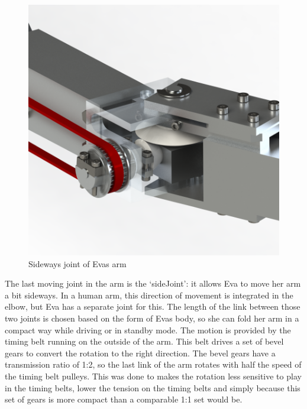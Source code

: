 \documentclass[technical_document.tex]{subfiles}
\begin{document}
\begin{figure}[ht!]
	\centering
	\mbox{\includegraphics[scale=1.0]{Images/arm_sideJoint.png}}
	\caption{Sideways joint of Eva\textquotesingle{}s arm}
	\label{fig:arm_sideJoint}
\end{figure}

The last moving joint in the arm is the ‘sideJoint’: it allows Eva to move her arm a bit sideways. In a human arm, this direction of movement is integrated in the elbow, but Eva has a separate joint for this. The length of the link between those two joints is chosen based on the form of Eva\textquotesingle{}s body, so she can fold her arm in a compact way while driving or in standby mode. The motion is provided by the timing belt running on the outside of the arm. This belt drives a set of bevel gears to convert the rotation to the right direction. The bevel gears have a transmission ratio of 1:2, so the last link of the arm rotates with half the speed of the timing belt pulleys. This was done to makes the rotation less sensitive to play in the timing belts, lower the tension on the timing belts and simply because this set of gears is more compact than a comparable 1:1 set would be.
\end{document}
